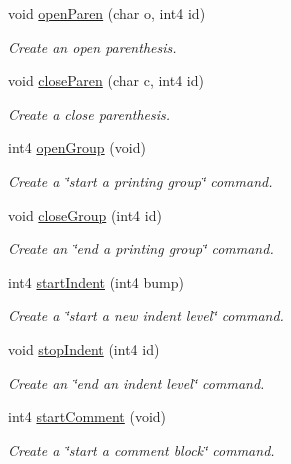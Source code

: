 \begin{DoxyCompactItemize}
void \mbox{\hyperlink{class_token_split_a5dcdb16c6b0aafe649f1615a93c2ee1c}{open\+Paren}} (char o, int4 id)
\begin{DoxyCompactList}\small\item\em Create an open parenthesis. \end{DoxyCompactList}\item 
void \mbox{\hyperlink{class_token_split_a713ced640b138dbe6931c2eb5dd7ddbe}{close\+Paren}} (char c, int4 id)
\begin{DoxyCompactList}\small\item\em Create a close parenthesis. \end{DoxyCompactList}\item 
int4 \mbox{\hyperlink{class_token_split_a467d591af196f9a606dd50586775f7d4}{open\+Group}} (void)
\begin{DoxyCompactList}\small\item\em Create a \char`\"{}start a printing group\char`\"{} command. \end{DoxyCompactList}\item 
void \mbox{\hyperlink{class_token_split_af01c0522ada54a8d777e6b9a1b840794}{close\+Group}} (int4 id)
\begin{DoxyCompactList}\small\item\em Create an \char`\"{}end a printing group\char`\"{} command. \end{DoxyCompactList}\item 
int4 \mbox{\hyperlink{class_token_split_abc86a21025a728d2dbe050fe22b9570b}{start\+Indent}} (int4 bump)
\begin{DoxyCompactList}\small\item\em Create a \char`\"{}start a new indent level\char`\"{} command. \end{DoxyCompactList}\item 
void \mbox{\hyperlink{class_token_split_af12160b7112cf50e7e537c22ddf76860}{stop\+Indent}} (int4 id)
\begin{DoxyCompactList}\small\item\em Create an \char`\"{}end an indent level\char`\"{} command. \end{DoxyCompactList}\item 
int4 \mbox{\hyperlink{class_token_split_a64074d483f92a724cf846c4893b1c1c7}{start\+Comment}} (void)
\begin{DoxyCompactList}\small\item\em Create a \char`\"{}start a comment block\char`\"{} command. \end{DoxyCompactList}\item 

\end{DoxyCompactItemize}

